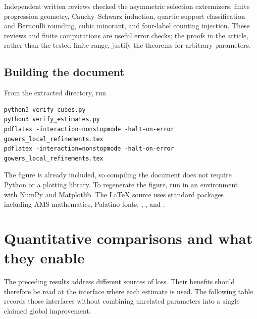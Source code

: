 \documentclass[11pt,letterpaper]{article}
\numberwithin{equation}{section}
\theoremstyle{definition}
\theoremstyle{remark}
\newcommand{\1}{\mathbf 1}
\newcommand{\srctag}[1]{\texorpdfstring{\enspace\textup{[#1]}}{ [#1]}}
\newcommand{\srcnote}[2]{\par\noindent{\small\textit{Source #1, delivered #2.}}\par}
\begin{document}
Independent written reviews checked the asymmetric selection extremizers,
finite progression geometry, Cauchy--Schwarz induction, quartic support
classification and Bernoulli rounding, cubic minorant, and four-label
counting injection. These reviews and finite computations are useful
error checks; the proofs in the article, rather than the tested finite
range, justify the theorems for arbitrary parameters.

\subsection{Building the document}

\begin{samepage}
From the extracted directory, run
\begin{verbatim}
python3 verify_cubes.py
python3 verify_estimates.py
pdflatex -interaction=nonstopmode -halt-on-error gowers_local_refinements.tex
pdflatex -interaction=nonstopmode -halt-on-error gowers_local_refinements.tex
\end{verbatim}
\end{samepage}
The figure is already included, so compiling the document does not
require Python or a plotting library. To regenerate the figure, run
 in an environment with NumPy and Matplotlib.
The LaTeX source uses standard packages including AMS mathematics,
Palatino fonts, , , and .

\section[{Quantitative comparisons and what they enable\srctag{04}}]{Quantitative comparisons and what they enable}\label{gsr:fz:04:sec:d9}
\srcnote{04}{Section 9}
\label{gsr:fz:04:sec:comparisons}

The preceding results address different sources of loss.  Their benefits
should therefore be read at the interface where each estimate is used.
The following table records those interfaces without combining unrelated
parameters into a single claimed global improvement.
\end{document}
